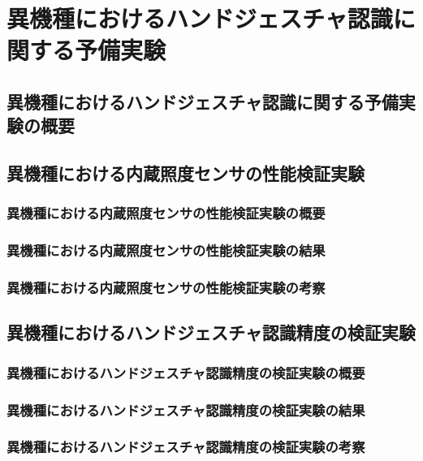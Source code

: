 \chapter{異機種におけるハンドジェスチャ認識に関する予備実験}

\section{異機種におけるハンドジェスチャ認識に関する予備実験の概要}

\section{異機種における内蔵照度センサの性能検証実験}
\subsection*{異機種における内蔵照度センサの性能検証実験の概要}
\subsection*{異機種における内蔵照度センサの性能検証実験の結果}
\subsection*{異機種における内蔵照度センサの性能検証実験の考察}
\section{異機種におけるハンドジェスチャ認識精度の検証実験}
\subsection*{異機種におけるハンドジェスチャ認識精度の検証実験の概要}
\subsection*{異機種におけるハンドジェスチャ認識精度の検証実験の結果}
\subsection*{異機種におけるハンドジェスチャ認識精度の検証実験の考察}
